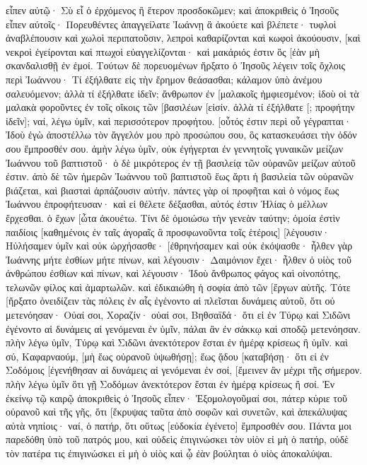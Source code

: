εἶπεν αὐτῷ· Σὺ εἶ ὁ ἐρχόμενος ἢ ἕτερον προσδοκῶμεν; 
καὶ ἀποκριθεὶς ὁ Ἰησοῦς εἶπεν αὐτοῖς· Πορευθέντες ἀπαγγείλατε Ἰωάννῃ ἃ ἀκούετε καὶ βλέπετε· 
τυφλοὶ ἀναβλέπουσιν καὶ χωλοὶ περιπατοῦσιν, λεπροὶ καθαρίζονται καὶ κωφοὶ ἀκούουσιν, [καὶ νεκροὶ ἐγείρονται καὶ πτωχοὶ εὐαγγελίζονται· 
καὶ μακάριός ἐστιν ὃς [ἐὰν μὴ σκανδαλισθῇ ἐν ἐμοί. 
Τούτων δὲ πορευομένων ἤρξατο ὁ Ἰησοῦς λέγειν τοῖς ὄχλοις περὶ Ἰωάννου· Τί ἐξήλθατε εἰς τὴν ἔρημον θεάσασθαι; κάλαμον ὑπὸ ἀνέμου σαλευόμενον; 
ἀλλὰ τί ἐξήλθατε ἰδεῖν; ἄνθρωπον ἐν [μαλακοῖς ἠμφιεσμένον; ἰδοὺ οἱ τὰ μαλακὰ φοροῦντες ἐν τοῖς οἴκοις τῶν [βασιλέων [εἰσίν. 
ἀλλὰ τί ἐξήλθατε [; προφήτην ἰδεῖν]; ναί, λέγω ὑμῖν, καὶ περισσότερον προφήτου. 
[οὗτός ἐστιν περὶ οὗ γέγραπται· Ἰδοὺ ἐγὼ ἀποστέλλω τὸν ἄγγελόν μου πρὸ προσώπου σου, ὃς κατασκευάσει τὴν ὁδόν σου ἔμπροσθέν σου. 
ἀμὴν λέγω ὑμῖν, οὐκ ἐγήγερται ἐν γεννητοῖς γυναικῶν μείζων Ἰωάννου τοῦ βαπτιστοῦ· ὁ δὲ μικρότερος ἐν τῇ βασιλείᾳ τῶν οὐρανῶν μείζων αὐτοῦ ἐστιν. 
ἀπὸ δὲ τῶν ἡμερῶν Ἰωάννου τοῦ βαπτιστοῦ ἕως ἄρτι ἡ βασιλεία τῶν οὐρανῶν βιάζεται, καὶ βιασταὶ ἁρπάζουσιν αὐτήν. 
πάντες γὰρ οἱ προφῆται καὶ ὁ νόμος ἕως Ἰωάννου ἐπροφήτευσαν· 
καὶ εἰ θέλετε δέξασθαι, αὐτός ἐστιν Ἠλίας ὁ μέλλων ἔρχεσθαι. 
ὁ ἔχων [ὦτα ἀκουέτω. 
Τίνι δὲ ὁμοιώσω τὴν γενεὰν ταύτην; ὁμοία ἐστὶν παιδίοις [καθημένοις ἐν ταῖς ἀγοραῖς ἃ προσφωνοῦντα τοῖς ἑτέροις] 
[λέγουσιν· Ηὐλήσαμεν ὑμῖν καὶ οὐκ ὠρχήσασθε· [ἐθρηνήσαμεν καὶ οὐκ ἐκόψασθε· 
ἦλθεν γὰρ Ἰωάννης μήτε ἐσθίων μήτε πίνων, καὶ λέγουσιν· Δαιμόνιον ἔχει· 
ἦλθεν ὁ υἱὸς τοῦ ἀνθρώπου ἐσθίων καὶ πίνων, καὶ λέγουσιν· Ἰδοὺ ἄνθρωπος φάγος καὶ οἰνοπότης, τελωνῶν φίλος καὶ ἁμαρτωλῶν. καὶ ἐδικαιώθη ἡ σοφία ἀπὸ τῶν [ἔργων αὐτῆς. 
Τότε [ἤρξατο ὀνειδίζειν τὰς πόλεις ἐν αἷς ἐγένοντο αἱ πλεῖσται δυνάμεις αὐτοῦ, ὅτι οὐ μετενόησαν· 
Οὐαί σοι, Χοραζίν· οὐαί σοι, Βηθσαϊδά· ὅτι εἰ ἐν Τύρῳ καὶ Σιδῶνι ἐγένοντο αἱ δυνάμεις αἱ γενόμεναι ἐν ὑμῖν, πάλαι ἂν ἐν σάκκῳ καὶ σποδῷ μετενόησαν. 
πλὴν λέγω ὑμῖν, Τύρῳ καὶ Σιδῶνι ἀνεκτότερον ἔσται ἐν ἡμέρᾳ κρίσεως ἢ ὑμῖν. 
καὶ σύ, Καφαρναούμ, [μὴ ἕως οὐρανοῦ ὑψωθήσῃ]; ἕως ᾅδου [καταβήσῃ· ὅτι εἰ ἐν Σοδόμοις [ἐγενήθησαν αἱ δυνάμεις αἱ γενόμεναι ἐν σοί, [ἔμεινεν ἂν μέχρι τῆς σήμερον. 
πλὴν λέγω ὑμῖν ὅτι γῇ Σοδόμων ἀνεκτότερον ἔσται ἐν ἡμέρᾳ κρίσεως ἢ σοί. 
Ἐν ἐκείνῳ τῷ καιρῷ ἀποκριθεὶς ὁ Ἰησοῦς εἶπεν· Ἐξομολογοῦμαί σοι, πάτερ κύριε τοῦ οὐρανοῦ καὶ τῆς γῆς, ὅτι [ἔκρυψας ταῦτα ἀπὸ σοφῶν καὶ συνετῶν, καὶ ἀπεκάλυψας αὐτὰ νηπίοις· 
ναί, ὁ πατήρ, ὅτι οὕτως [εὐδοκία ἐγένετο] ἔμπροσθέν σου. 
Πάντα μοι παρεδόθη ὑπὸ τοῦ πατρός μου, καὶ οὐδεὶς ἐπιγινώσκει τὸν υἱὸν εἰ μὴ ὁ πατήρ, οὐδὲ τὸν πατέρα τις ἐπιγινώσκει εἰ μὴ ὁ υἱὸς καὶ ᾧ ἐὰν βούληται ὁ υἱὸς ἀποκαλύψαι. 
